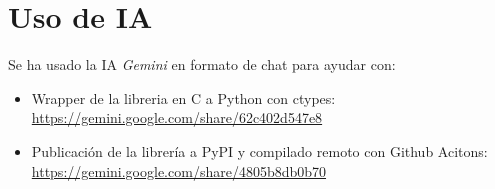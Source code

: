 \section{Uso de IA} 

Se ha usado la IA \textit{Gemini} en formato de chat para ayudar con: 
\begin{itemize}
    \item Wrapper de la libreria en C a Python con ctypes: \\
        \url{https://gemini.google.com/share/62c402d547e8} 
    \item Publicaci\'on de la librer\'ia a PyPI y compilado remoto con 
        Github Acitons: \\
        \url{https://gemini.google.com/share/4805b8db0b70}
\end{itemize}
